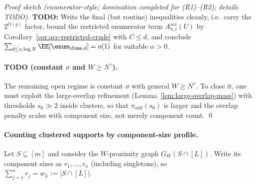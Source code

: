 \begin{proof}[Proof sketch (enumerator-style; domination completed for (R1)--(R2); details TODO)]
\noindent\textbf{TODO:} Write the final (but routine) inequalities cleanly, i.e.\ carry the $2^{O(g)}$ factor, bound the
restricted enumerator term $A^{\mathrm{acc}}_{h,t}(U)$ by Corollary~\ref{cor:acc-restricted-crude} with $C\le d$,
and conclude $\sum_{d\le \alpha\log N}\EE[\enum_{\Cone,d}]=o(1)$ for suitable $\alpha>0$.

\paragraph{TODO (constant $\sigma$ and $W\ge N^\gamma$).}
The remaining open regime is constant $\sigma$ with general $W\ge N^\gamma$.
To close it, one must exploit the large-overlap refinement (Lemma~\ref{lem:large-overlap-mass}) with thresholds
$s_0\gg 2$ inside clusters, so that $\pi_{\mathrm{odd}}(s_0)$ is larger and the overlap penalty scales with component size,
not merely component count.
\qed
\end{proof}




%
%

\paragraph{Counting clustered supports by component-size profile.}
Let $S\subseteq [m]$ and consider the $W$-proximity graph $G_W(S\cap[L])$.
Write its component sizes as $r_1,\dots,r_\kappa$ (including singletons), so $\sum_{j=1}^\kappa r_j=w_L:=|S\cap[L]|$.

